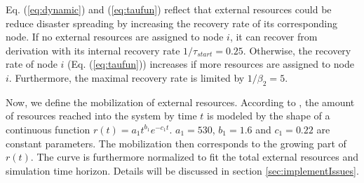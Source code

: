 Eq. (\ref{eq:dynamic}) and (\ref{eq:taufun}) reflect that external resources could be reduce disaster spreading by increasing the recovery rate of its corresponding node. If no external resources are assigned to node $i$, it can recover from derivation with its internal recovery rate $1/\tau_{start}=0.25$. Otherwise, the recovery rate of node $i$ (Eq. (\ref{eq:taufun})) increases if more resources are assigned to node $i$. Furthermore, the maximal recovery rate is limited by $1/\beta_2=5$.

Now, we define the mobilization of external resources. According to \cite{buzna2007efficient}, the amount of resources reached into the system by time $t$ is modeled by the shape of a continuous function $r(t) = a_1 t^{b_1} e^{-c_1 t}$. $a_1=530$, $b_1=1.6$ and $c_1=0.22$ are constant parameters. The mobilization then corresponds to the growing part of $r(t)$. The curve is furthermore normalized to fit the total external resources and simulation time horizon. Details will be discussed in section \ref{sec:implementIssues}.



